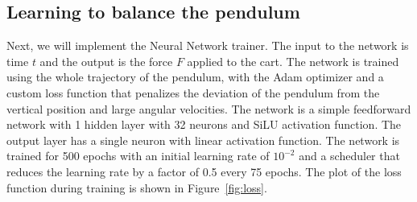 \documentclass[unicode,11pt,a4paper,oneside,numbers=endperiod,openany]{scrartcl}
\begin{document}
\subsection*{Learning to balance the pendulum}
Next, we will implement the Neural Network trainer.
The input to the network is time $t$ and the output is the force $F$ applied to
the cart. 
The network is trained using the whole trajectory of the pendulum, with the
Adam optimizer and a custom loss function that penalizes the deviation of the
pendulum from the vertical position and large angular velocities. 
The network is a simple feedforward network with
1 hidden layer with 32 neurons and SiLU activation function. The output layer
has a single neuron with linear activation function. The network is trained for
500 epochs with an initial learning rate of $10^{-2}$ and a scheduler that
reduces the learning rate by a factor of 0.5 every 75 epochs.
The plot of the loss function during training is shown in Figure~\ref{fig:loss}.
\end{document}
